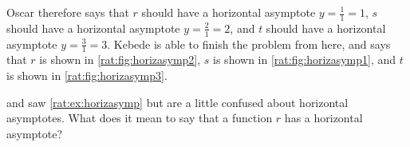 \begin{pccexample}
 Oscar therefore says that $r$ should have a horizontal asymptote $y=\frac{1}{1}=1$, $s$ should 
 have a horizontal asymptote $y=\frac{2}{1}=2$, and $t$ should have a horizontal asymptote 
 $y=\frac{3}{1}=3$. Kebede is able to finish the problem from here, and says that $r$ is 
 shown in \cref{rat:fig:horizasymp2}, $s$ is shown in \cref{rat:fig:horizasymp1}, and 
 $t$ is shown in \cref{rat:fig:horizasymp3}.
\end{pccexample}

\begin{pccexample}
  and  saw \cref{rat:ex:horizasymp} but are a little confused 
 about horizontal asymptotes. What does it mean to say that a function $r$ has a horizontal
 asymptote? 
 

\end{pccexample}
